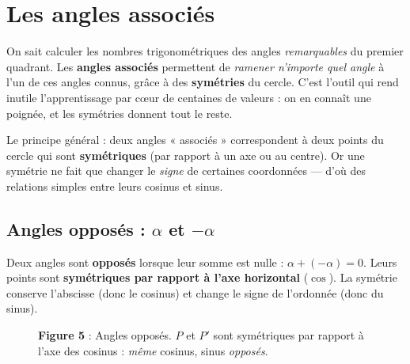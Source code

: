 \documentclass[11pt,a4paper]{article}
\begin{document}
\section{Les angles associés}
On sait calculer les nombres trigonométriques des angles \emph{remarquables} du premier quadrant.
Les \textbf{angles associés} permettent de \emph{ramener n'importe quel angle} à l'un de ces angles
connus, grâce à des \textbf{symétries} du cercle. C'est l'outil qui rend inutile l'apprentissage par
cœur de centaines de valeurs : on en connaît une poignée, et les symétries donnent tout le reste.

Le principe général : deux angles « associés » correspondent à deux points du cercle qui sont
\textbf{symétriques} (par rapport à un axe ou au centre). Or une symétrie ne fait que changer le
\emph{signe} de certaines coordonnées --- d'où des relations simples entre leurs cosinus et sinus.

\subsection{Angles opposés : $\alpha$ et $-\alpha$}
Deux angles sont \textbf{opposés} lorsque leur somme est nulle : $\alpha+(-\alpha)=0$. Leurs points
sont \textbf{symétriques par rapport à l'axe horizontal} ($\cos$). La symétrie conserve l'abscisse
(donc le cosinus) et change le signe de l'ordonnée (donc du sinus).

\begin{figure}[h]
\centering
{}
\caption*{\small\textbf{\textcolor{primary}{Figure 5}} : Angles opposés. $P$ et $P'$ sont
symétriques par rapport à l'axe des cosinus : \emph{même} cosinus, sinus \emph{opposés}.}
\end{figure}
\end{document}
